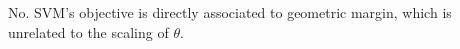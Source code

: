 \begin{answer}
No. SVM's objective is directly associated to geometric margin, which is unrelated to the scaling of $\theta$.
\end{answer}
